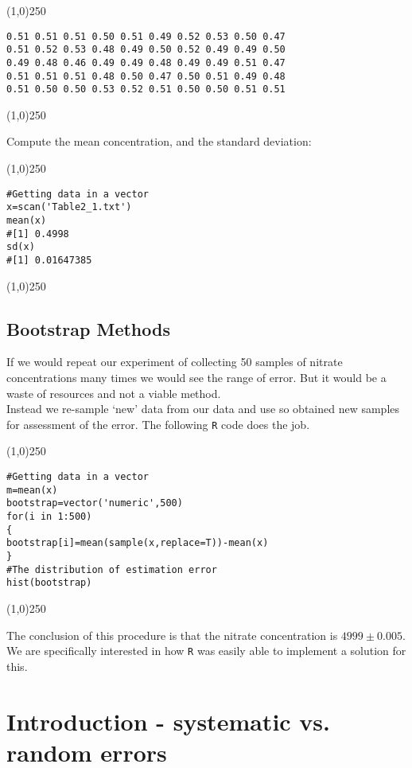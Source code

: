 \begin{center}
	\line(1,0){250}
\end{center}
\begin{verbatim}
0.51 0.51 0.51 0.50 0.51 0.49 0.52 0.53 0.50 0.47
0.51 0.52 0.53 0.48 0.49 0.50 0.52 0.49 0.49 0.50
0.49 0.48 0.46 0.49 0.49 0.48 0.49 0.49 0.51 0.47
0.51 0.51 0.51 0.48 0.50 0.47 0.50 0.51 0.49 0.48
0.51 0.50 0.50 0.53 0.52 0.51 0.50 0.50 0.51 0.51
\end{verbatim}
\begin{center}
	\line(1,0){250}
\end{center}
Compute the mean concentration, and the standard deviation:
\begin{center}
	\line(1,0){250}
\end{center}
\begin{verbatim}
#Getting data in a vector
x=scan('Table2_1.txt')
mean(x)
#[1] 0.4998
sd(x)
#[1] 0.01647385
\end{verbatim}
\begin{center}
	\line(1,0){250}
\end{center}
\newpage

\subsection{Bootstrap Methods}
If we would repeat our experiment of collecting 50 samples of nitrate concentrations many times we would see the range of error. But it would be a waste of resources and not a viable method.\\
Instead we re-sample `new' data from our data and use so obtained new samples for assessment of the error.
The following \texttt{R} code does the job.
\begin{center}
	\line(1,0){250}
\end{center}
\begin{verbatim}
#Getting data in a vector
m=mean(x)
bootstrap=vector('numeric',500)
for(i in 1:500)
{
bootstrap[i]=mean(sample(x,replace=T))-mean(x)
}
#The distribution of estimation error
hist(bootstrap)
\end{verbatim}
\begin{center}
	\line(1,0){250}
\end{center}
The conclusion of this procedure is that the nitrate concentration is $4999 \pm 0.005$. We are specifically interested in how \texttt{R} was easily able to implement a solution for this.
\newpage
\section{Introduction - systematic vs. random errors}




